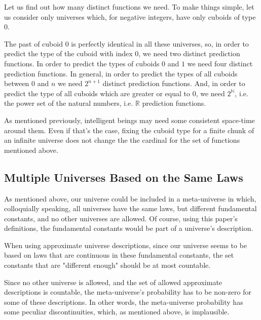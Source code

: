 \documentclass[a4paper
,draft
]{article}
\def\reale{\mathbb{R}}
\def\naturale{\mathbb{N}}
\newcommand{\ghilimele}[1]{``#1"}
\begin{document}
Let us find out how many distinct functions we need.
To make things simple, let us consider only universes which, for negative
integers, have only cuboids of type $0$.

The past of cuboid $0$ is perfectly identical in all these universes, so,
in order to predict the type of the cuboid with index $0$,
we need two distinct prediction functions.
In order to predict the types of cuboids $0$ and $1$ we need four
distinct prediction functions.
In general, in order to predict the types of all cuboids between $0$ and $n$
we need $2^{n+1}$ distinct prediction functions.
And, in order to predict the type of all cuboids which are greater or equal
to $0$, we need $2^\naturale$, i.e. the power set of the natural numbers,
i.e. $\reale$ prediction functions.

As mentioned previously, intelligent beings may need some consistent space-time
around them. Even if that's the case, fixing the cuboid type for a finite
chunk of an infinite universe does not change the the cardinal for the set of
functions mentioned above.

\subsection {Multiple Universes Based on the Same Laws}

As mentioned above, our universe could be included in a meta-universe in which,
colloquially speaking, all universes have the same laws,
but different fundamental constants, and no other universes are allowed.
Of course, using this paper's definitions,
the fundamental constants would be part of a universe's description.

When using approximate universe descriptions, since our universe
seems to be based on laws that are continuous in these fundamental constants,
the set constants that are "different enough" should be at most countable.

Since no other universe is allowed, and the set of allowed approximate
descriptions is countable, the meta-universe's probability
has to be non-zero for some of these descriptions. In other words, the
meta-universe probability has some peculiar discontinuities, which, as
mentioned above, is implausible.


\end{document}
